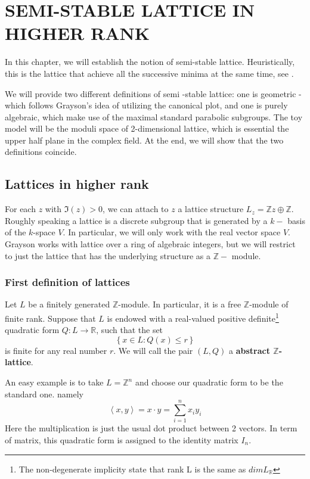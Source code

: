 \chapter{SEMI-STABLE LATTICE IN HIGHER RANK}
In this chapter, we will establish the notion of semi-stable lattice. Heuristically,
this is the lattice that achieve all the successive minima at the same time, see \cite{}.

We will provide two different definitions of semi -stable lattice: one is geometric - which follows Grayson's idea of utilizing
the canonical plot, and one is purely algebraic, which make use of the maximal standard parabolic subgroups.
The toy model will be the moduli space of 2-dimensional lattice, which is essential the upper half plane in the complex field.
At the end, we will show that the two definitions coincide.
\section{Lattices in higher rank}
For each $z$ with $\Im(z)>0$, we can attach to $z$ a lattice structure $L_z = \mathbb{Z}z \oplus \mathbb{Z}$. Roughly speaking
a lattice is a discrete  subgroup that is generated by a $k-$ basis of the $k$-space $V$.
In particular, we will only work with the real vector space $V$. Grayson works with lattice over a ring of algebraic integers, but we will restrict to
just the lattice that has the underlying structure as a $\mathbb{Z}-$ module.

\subsection{First definition of lattices}
\begin{definition}[\label = Abstract $\mathbb{Z}$-lattices]
    Let $L$ be a finitely generated $\mathbb{Z}$-module. In particular, it is a free $\mathbb{Z}$-module
    of finite rank. Suppose that $L$ is endowed with a real-valued  positive definite\footnote{The non-degenerate implicity state that rank L is the same as $dim L_\mathbb{R}$} quadratic form $Q\colon L \to \mathbb{R}$, such that the set
    \[\left\lbrace x \in L: Q(x) \le r\right\rbrace \]
    is finite for any real number $r$.
    We will call  the pair $(L,Q)$ a \textbf{abstract $\mathbb{Z}$-lattice}.
\end{definition}

An easy example is to take $L = \mathbb{Z}^n$ and choose our quadratic form to be the standard one. namely
\[\left\langle x,y \right\rangle = x \cdot y = \sum_{i=1}^n x_iy_i\]
Here the multiplication is just the usual dot product between 2 vectors. In term of matrix, this quadratic form is assigned to the
identity matrix $I_n$.

